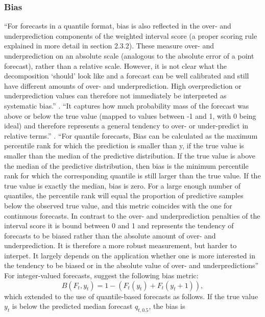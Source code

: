 \subsubsection{Bias}
``For forecasts in a quantile format, bias is also reflected in the over- and underprediction
components of the weighted interval score (a proper scoring rule explained in more detail
in section 2.3.2). These measure over- and underprediction on an absolute scale (analogous
to the absolute error of a point forecast), rather than a relative scale. However, it is not
clear what the decomposition ‘should’ look like and a forecast can be well calibrated and still
have different amounts of over- and underprediction. High overprediction or underprediction
values can therefore not immediately be interpreted as systematic bias.'' \citep{bosse_evaluating_2022}.
``It captures how much probability mass of the forecast was above or below the
true value (mapped to values between -1 and 1, with 0 being ideal) and therefore represents
a general tendency to over- or under-predict in relative terms.'' \citep{bosse_evaluating_2022}.
``For quantile forecasts, Bias can be calculated as the maximum
percentile rank for which the prediction is smaller than y, if the true
value is smaller than the median of the predictive distribution. If the
true value is above the median of the predictive distribution, then
bias is the minimum percentile rank for which the corresponding
quantile is still larger than the true value. If the true value is exactly
the median, bias is zero. For a large enough number of quantiles, the
percentile rank will equal the proportion of predictive samples below
the observed true value, and this metric coincides with the one for
continuous forecasts. In contrast to the over- and underprediction penalties of
the interval score it is bound between 0 and 1 and represents the
tendency of forecasts to be biased rather than the absolute amount of
over- and underprediction. It is therefore a more robust
measurement, but harder to interpet. It largely depends on the
application whether one is more interested in the tendency to be
biased or in the absolute value of over- and underpredictions'' \citep{bosse_evaluating_2022}
For integer-valued forecasts, \cite{funk_assessing_nodate} suggest the following bias metric: 
\begin{equation*}
B(F_t, y_t) = 1 - (F_t(y_t) + F_t(y_t + 1)),
\end{equation*}
which \cite{bosse_evaluating_2022} extended to the use of quantile-based forecasts as follows. If the true value $y_t$ is below the predicted median forecast $q_{t,0.5}$, the bias is 
